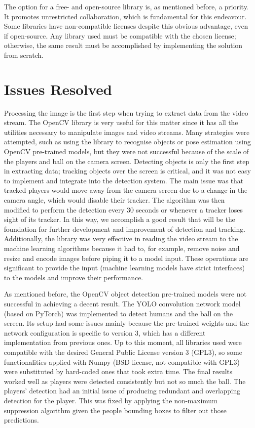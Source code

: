 \documentclass[
    11pt,
    oneside
]{report}
\begin{document}
The option for a free- and open-source library is, as mentioned before, a priority. It promotes unrestricted collaboration, which is fundamental for this endeavour. Some libraries have non-compatible licenses despite this obvious advantage, even if open-source. Any library used must be compatible with the chosen license; otherwise, the same result must be accomplished by implementing the solution from scratch.



\section{Issues Resolved}


Processing the image is the first step when trying to extract data from the video stream. The OpenCV library \cite{opencv} is very useful for this matter since it has all the utilities necessary to manipulate images and video streams. Many strategies were attempted, such as using the library to recognise objects or pose estimation using OpenCV \cite{opencv} pre-trained models, but they were not successful because of the scale of the players and ball on the camera screen. Detecting objects is only the first step in extracting data; tracking objects over the screen is critical, and it was not easy to implement and integrate into the detection system. The main issue was that tracked players would move away from the camera screen due to a change in the camera angle, which would disable their tracker. The algorithm was then modified to perform the detection every 30 seconds or whenever a tracker loses sight of its tracker. In this way, we accomplish a good result that will be the foundation for further development and improvement of detection and tracking. Additionally, the library was very effective in reading the video stream to the machine learning algorithms because it had to, for example, remove noise and resize and encode images before piping it to a model input. These operations are significant to provide the input (machine learning models have strict interfaces) to the models and improve their performance.


As mentioned before, the OpenCV \cite{opencv} object detection pre-trained models were not successful in achieving a decent result. The YOLO \cite{yolo} convolution network model (based on PyTorch) was implemented to detect humans and the ball on the screen. Its setup had some issues mainly because the pre-trained weights and the network configuration is specific to version 3, which has a different implementation from previous ones. Up to this moment, all libraries used were compatible with the desired General Public License version 3 (GPL3), so some functionalities applied with Numpy \cite{numpy} (BSD license, not compatible with GPL3) were substituted by hard-coded ones that took extra time. The final results worked well as players were detected consistently but not so much the ball. The players' detection had an initial issue of producing redundant and overlapping detection for the player. This was fixed by applying the non-maximum suppression algorithm given the people bounding boxes to filter out those predictions.
\end{document}
